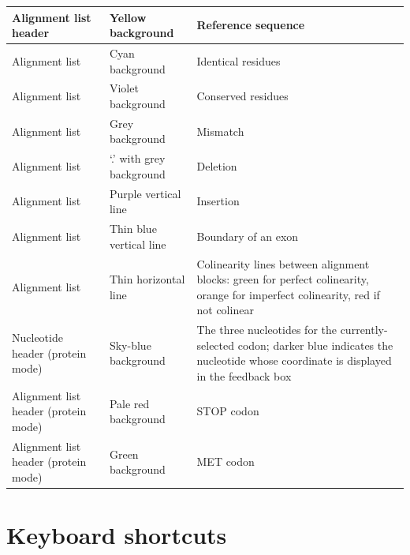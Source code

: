 \documentclass[letterpaper]{article}
\begin{document}
\begin{flushleft}
\tablehead{}
\begin{supertabular}{p{3.8009999cm}p{3.552cm}p{6.3cm}}
 Alignment list header &  Yellow background &  Reference sequence\\\hline
 Alignment list &  Cyan background &  Identical residues\\\hline
 Alignment list & Violet background & Conserved residues\\\hline
 Alignment list & Grey background & Mismatch\\\hline
 Alignment list & {\textquoteleft}.{\textquoteright} with grey background & Deletion\\\hline
 Alignment list & Purple vertical line & Insertion\\\hline
 Alignment list & Thin blue vertical line & Boundary of an exon\\\hline
 Alignment list & Thin horizontal line & Colinearity lines between alignment blocks: green for perfect colinearity, orange for imperfect colinearity, red if not colinear\\\hline
 Nucleotide header (protein mode) & Sky-blue background & The three nucleotides for the currently-selected codon; darker blue indicates the nucleotide whose coordinate is displayed in the feedback box\\\hline
 Alignment list header (protein mode) & Pale red background & STOP codon\\\hline
 Alignment list header (protein mode) & Green background & MET codon\\
\end{supertabular}
\end{flushleft}

{\color[rgb]{0.0,0.27058825,0.5254902}\section[Keyboard shortcuts]{Keyboard shortcuts}}
\hypertarget{RefHeading2701056909880}{}
\bigskip
\end{document}
